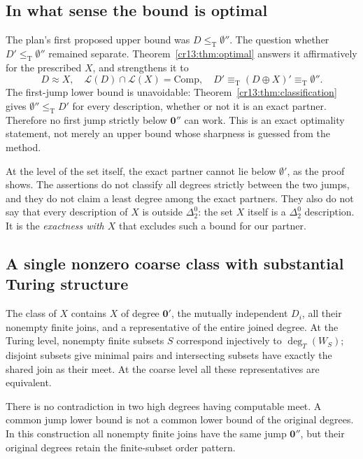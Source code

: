 \documentclass[11pt,letterpaper]{article}
\theoremstyle{definition}
\theoremstyle{remark}\newtheorem{remark}[theorem]{Remark}
\numberwithin{equation}{section}
\newcommand{\leT}{\leq_{\mathrm T}}
\newcommand{\eqT}{\equiv_{\mathrm T}}
\newcommand{\Low}{\mathcal L}
\newcommand{\Comp}{\mathrm{Comp}}
\newcommand{\zero}{\mathbf 0}
\begin{document}
\subsection{In what sense the bound is optimal}
The plan's first proposed upper bound was $D\leT\emptyset''$. The question whether $D'\leT\emptyset''$ remained separate. Theorem~\ref{cr13:thm:optimal} answers it affirmatively for the prescribed $X$, and strengthens it to
\begin{equation}\label{cr13:eq:singlec6}
 D\approx X,\quad \Low(D)\cap\Low(X)=\Comp,
 \quad D'\eqT(D\oplus X)'\eqT\emptyset''.
\end{equation}
The first-jump lower bound is unavoidable: Theorem~\ref{cr13:thm:classification} gives $\emptyset''\leT D'$ for every description, whether or not it is an exact partner. Therefore no first jump strictly below $\zero''$ can work. This is an exact optimality statement, not merely an upper bound whose sharpness is guessed from the method.

At the level of the set itself, the exact partner cannot lie below $\emptyset'$, as the proof shows. The assertions do not classify all degrees strictly between the two jumps, and they do not claim a least degree among the exact partners. They also do not say that every description of $X$ is outside $\Delta^0_2$: the set $X$ itself is a $\Delta^0_2$ description. It is the \emph{exactness with $X$} that excludes such a bound for our partner.

\subsection{A single nonzero coarse class with substantial Turing structure}
The class of $X$ contains $X$ of degree $\zero'$, the mutually independent $D_i$, all their nonempty finite joins, and a representative of the entire joined degree. At the Turing level, nonempty finite subsets $S$ correspond injectively to $\deg_T(W_S)$; disjoint subsets give minimal pairs and intersecting subsets have exactly the shared join as their meet. At the coarse level all these representatives are equivalent.

There is no contradiction in two high degrees having computable meet. A common jump lower bound is not a common lower bound of the original degrees. In this construction all nonempty finite joins have the same jump $\zero''$, but their original degrees retain the finite-subset order pattern.
\end{document}
